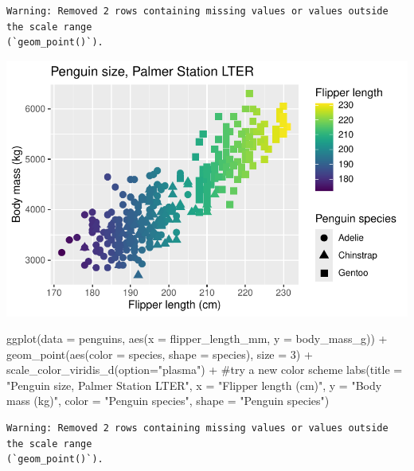 \documentclass[
  letterpaper,
  DIV=11,
  numbers=noendperiod]{scrreprt}
\newenvironment{Shaded}{\begin{snugshade}}{\end{snugshade}}
\newcommand{\AttributeTok}[1]{\textcolor[rgb]{0.40,0.45,0.13}{#1}}
\newcommand{\CommentTok}[1]{\textcolor[rgb]{0.37,0.37,0.37}{#1}}
\newcommand{\DecValTok}[1]{\textcolor[rgb]{0.68,0.00,0.00}{#1}}
\newcommand{\FunctionTok}[1]{\textcolor[rgb]{0.28,0.35,0.67}{#1}}
\newcommand{\NormalTok}[1]{\textcolor[rgb]{0.00,0.23,0.31}{#1}}
\newcommand{\SpecialCharTok}[1]{\textcolor[rgb]{0.37,0.37,0.37}{#1}}
\newcommand{\StringTok}[1]{\textcolor[rgb]{0.13,0.47,0.30}{#1}}
\begin{document}
\begin{verbatim}
Warning: Removed 2 rows containing missing values or values outside the scale range
(`geom_point()`).
\end{verbatim}

\includegraphics{scripts/02_dataViz/class4_files/figure-pdf/viridis-1.pdf}

\begin{Shaded}
\begin{Highlighting}[]
\FunctionTok{ggplot}\NormalTok{(}\AttributeTok{data =}\NormalTok{ penguins, }\FunctionTok{aes}\NormalTok{(}\AttributeTok{x =}\NormalTok{ flipper\_length\_mm, }\AttributeTok{y =}\NormalTok{ body\_mass\_g)) }\SpecialCharTok{+}
  \FunctionTok{geom\_point}\NormalTok{(}\FunctionTok{aes}\NormalTok{(}\AttributeTok{color =}\NormalTok{ species, }\AttributeTok{shape =}\NormalTok{ species), }\AttributeTok{size =} \DecValTok{3}\NormalTok{) }\SpecialCharTok{+}
  \FunctionTok{scale\_color\_viridis\_d}\NormalTok{(}\AttributeTok{option=}\StringTok{"plasma"}\NormalTok{) }\SpecialCharTok{+} \CommentTok{\#try a new color scheme}
  \FunctionTok{labs}\NormalTok{(}\AttributeTok{title =} \StringTok{"Penguin size, Palmer Station LTER"}\NormalTok{,}
       \AttributeTok{x =} \StringTok{"Flipper length (cm)"}\NormalTok{,}
       \AttributeTok{y =} \StringTok{"Body mass (kg)"}\NormalTok{,}
       \AttributeTok{color =} \StringTok{"Penguin species"}\NormalTok{,}
       \AttributeTok{shape =} \StringTok{"Penguin species"}\NormalTok{)}
\end{Highlighting}
\end{Shaded}

\begin{verbatim}
Warning: Removed 2 rows containing missing values or values outside the scale range
(`geom_point()`).
\end{verbatim}
\end{document}
